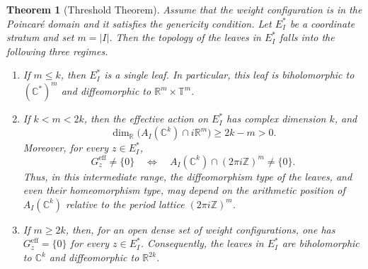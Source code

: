 \documentclass[11pt]{amsart}
\newtheorem{theorem}{Theorem}[section]
\theoremstyle{definition}
\theoremstyle{remark}
\newcommand{\Z}{\mathbb{Z}}
\newcommand{\C}{\mathbb{C}}
\newcommand{\R}{\mathbb{R}}
\newcommand{\T}{\mathbb{T}}
\newcommand{\stratSS}[1]{E_{#1}^*}
\newcommand{\stratS}[1]{\stratSS{#1}}
\begin{document}
\begin{theorem}[Threshold Theorem]\label{thm:threshold}
	Assume that the weight configuration is in the Poincaré domain and it satisfies the genericity condition.
	Let $\stratS{I}$ be a coordinate stratum and set $m=|I|$.
	Then the topology of the leaves in $\stratS{I}$ falls into the following three regimes.

	\begin{enumerate}

		\item If $m\le k$, then $\stratS{I}$ is a single leaf.
		      In particular, this leaf is biholomorphic to $(\C^*)^m$ and diffeomorphic to $\R^m\times\T^m$.


\item If $k<m<2k$, then the effective action on $\stratS{I}$ has
complex dimension $k$, and
\[
    \dim_{\R}\bigl(A_I(\C^k)\cap i\R^m\bigr)
    \geq 2k-m>0.
\]
Moreover, for every $z\in\stratS{I}$,
\[
    G_z^{\mathrm{eff}}\neq\{0\}
    \quad\Longleftrightarrow\quad
    A_I(\C^k)\cap(2\pi i\Z)^m\neq\{0\}.
\]
Thus, in this intermediate range, the diffeomorphism type of the leaves, and even their homeomorphism type, may depend on the arithmetic position of $A_I(\C^k)$ relative to the period lattice $(2\pi i\Z)^m$.
		      


		\item If $m\ge 2k$, then, for an open dense set of weight configurations, one has $G_z^{\mathrm{eff}}=\{0\}$ for every $z\in \stratS{I}$.
		      Consequently, the leaves in $\stratS{I}$ are biholomorphic to $\C^k$ and diffeomorphic to $\R^{2k}$.
	\end{enumerate}
\end{theorem}
\end{document}

